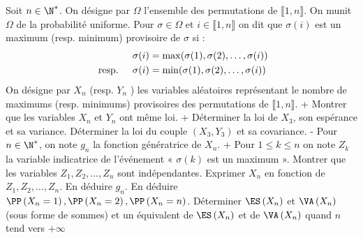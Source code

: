 \begin{exercise}
 Soit $n \in \N^{*}$. On désigne par $\Omega$ l'ensemble des permutations de $\llbracket 1, n \rrbracket $. On munit $\Omega$ de la probabilité uniforme. Pour $\sigma \in \Omega$ et $i \in \llbracket 1, n \rrbracket$ on dit que $\sigma(i)$ est un maximum (resp. minimum) provisoire de $\sigma$ si :
\begin{equation*}\aligned
\sigma(i) &= \max (\sigma(1), \sigma(2), \ldots, \sigma(i)) \\
\text { resp. }\quad \sigma(i)&=\min (\sigma(1), \sigma(2), \ldots, \sigma(i))
\endaligned
\end{equation*}
On désigne par $X_{n}$ (resp. $Y_{n}$ ) les variables aléatoires représentant le nombre de maximums (resp. minimums) provisoires des permutations de $\llbracket 1, n \rrbracket$.
\question+ Montrer que les variables $X_{n}$ et $Y_{n}$ ont même loi.
\question\question+  Déterminer la loi de $X_{3}$, son espérance et sa variance.
\question Déterminer la loi du couple $\left(X_{3}, Y_{3}\right)$ et sa covariance.
\question- Pour $n \in \N^{*}$, on note $g_{n}$ la fonction génératrice de $X_{n}$.
\question+ Pour $1 \leqslant k \leqslant n$ on note $Z_{k}$ la variable indicatrice de l'événement « $\sigma(k)$ est un maximum ». Montrer que les variables $Z_{1}, Z_{2}, \ldots, Z_{n}$ sont indépendantes.
\question Exprimer $X_{n}$ en fonction de $Z_{1}, Z_{2}, \ldots, Z_{n} $. En déduire $g_{n}$.
\question En déduire $\PP\left(X_{n}=1\right), \PP\left(X_{n}=2\right), \PP\left(X_{n}=n\right)$.
\question Déterminer $\ES\left(X_{n}\right)$ et $\VA\left(X_{n}\right)$ (sous forme de sommes) et un équivalent de $\ES\left(X_{n}\right)$ et de $\VA\left(X_{n}\right)$ quand $n$ tend vers $+\infty$
\endquestions 
\end{exercise}

